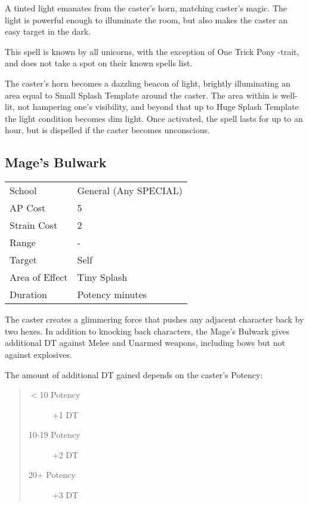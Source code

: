 \documentclass[11pt,a4paper,twocolumn]{book}
\begin{document}
\medskip

A tinted light emanates from the caster's horn, matching caster's magic. The light is powerful enough to illuminate the room, but also makes the caster an easy target in the dark.

This spell is known by all unicorns, with the exception of One Trick Pony -trait, and does not take a spot on their known spells list.

The caster's horn becomes a dazzling beacon of light, brightly illuminating an area equal to Small Splash Template around the caster. The area within is well-lit, not hampering one's visibility, and beyond that up to Huge Splash Template the light condition becomes dim light. Once activated, the spell lasts for up to an hour, but is dispelled if the caster becomes unconscious.

\vfill

\subsection*{Mage's Bulwark}
{
	\begin{tabu} to 75mm{| X[l,4] | X[l,7] |}
		\hline
		School 			& General (Any SPECIAL) 	\\
		AP Cost	      	& 5 					\\
		Strain Cost     & 2 					\\
		Range     		& - 					\\
		Target      	& Self					\\
		Area of Effect  & Tiny Splash  	 				\\
		Duration     	& Potency minutes		\\ \hline
	\end{tabu}
	
}

\medskip

The caster creates a glimmering force that pushes any adjacent character back by two hexes. In addition to knocking back characters, the Mage's Bulwark gives additional DT against Melee and Unarmed weapons, including bows but not against explosives.

The amount of additional DT gained depends on the caster's Potency:
\begin{quote}
	\begin{description}
		\item[$<$10 Potency] 	+1 DT
		\item[10-19 Potency] 	+2 DT
		\item[20+ Potency] 		+3 DT
	\end{description}	
\end{quote}
\end{document}
